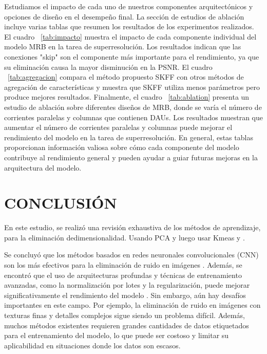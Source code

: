 \documentclass[a4paper,
               ]{jacow}
\begin{document}
Estudiamos el impacto de cada uno de nuestros componentes arquitectónicos y opciones de diseño en el desempeño final. La sección de estudios de ablación incluye varias tablas que resumen los resultados de los experimentos realizados. El cuadro ~\ref{tab:impacto} muestra el impacto de cada componente individual del modelo MRB en la tarea de superresolución. Los resultados indican que las conexiones "skip" son el componente más importante para el rendimiento, ya que su eliminación causa la mayor disminución en la PSNR. El cuadro ~\ref{tab:agregacion} compara el método propuesto SKFF con otros métodos de agregación de características y muestra que SKFF utiliza menos parámetros pero produce mejores resultados. Finalmente, el cuadro ~\ref{tab:ablation} presenta un estudio de ablación sobre diferentes diseños de MRB, donde se varía el número de corrientes paralelas y columnas que contienen DAUs. Los resultados muestran que aumentar el número de corrientes paralelas y columnas puede mejorar el rendimiento del modelo en la tarea de superresolución. En general, estas tablas proporcionan información valiosa sobre cómo cada componente del modelo contribuye al rendimiento general y pueden ayudar a guiar futuras mejoras en la arquitectura del modelo.

\section{CONCLUSIÓN}

En este estudio, se realizó una revisión exhaustiva de los métodos de aprendizaje, para la eliminación dedimensionalidad. Usando PCA y luego usar Kmeas y .

Se concluyó que los métodos basados en redes neuronales convolucionales (CNN) son los más efectivos para la eliminación de ruido en imágenes \cite{zhang2017beyond, lehtinen2018noise2noise, tai2017image}. Además, se encontró que el uso de arquitecturas profundas y técnicas de entrenamiento avanzadas, como la normalización por lotes y la regularización, puede mejorar significativamente el rendimiento del modelo \cite{lefkimmiatis2018universal}. Sin embargo, aún hay desafíos importantes en este campo. Por ejemplo, la eliminación de ruido en imágenes con texturas finas y detalles complejos sigue siendo un problema difícil. Además, muchos métodos existentes requieren grandes cantidades de datos etiquetados para el entrenamiento del modelo, lo que puede ser costoso y limitar su aplicabilidad en situaciones donde los datos son escasos.
\end{document}
